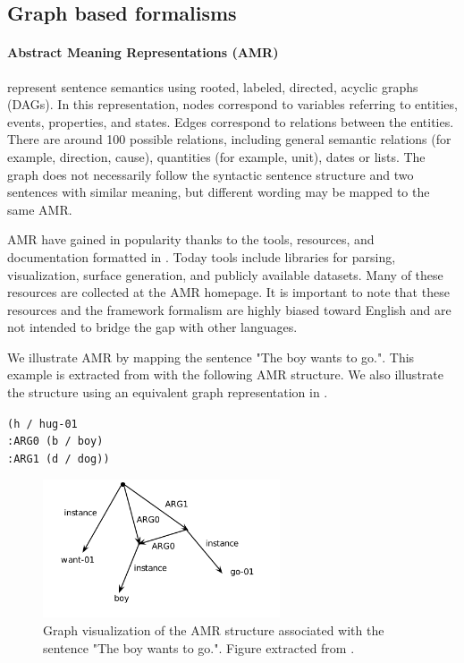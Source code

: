 \subsection{Graph based formalisms} 

\paragraph{Abstract Meaning Representations (AMR)} represent sentence semantics using rooted, labeled, directed, acyclic graphs (DAGs). In this representation, nodes correspond to variables referring to entities, events, properties, and states. Edges correspond to relations between the entities. There are around 100 possible relations, including general semantic relations (for example, direction, cause), quantities (for example, unit), dates or lists. The graph does not necessarily follow the syntactic sentence structure and two sentences with similar meaning, but different wording may be mapped to the same AMR. 

AMR have gained in popularity thanks to the tools, resources, and documentation formatted in \textcite{banarescu2013abstract}. Today tools include libraries for parsing, visualization, surface generation, and publicly available datasets. Many of these resources are collected at the AMR homepage. It is important to note that these resources and the framework formalism are highly biased toward English and are not intended to bridge the gap with other languages.

We illustrate AMR by mapping the sentence "The boy wants to go.". This example is extracted from \textcite{banarescu2013abstract} with the following AMR structure. We also illustrate the structure using an equivalent graph representation in .

\begin{center}
\texttt{(h\,/\,hug-01
    \\ \T :ARG0\,(b\,/\,boy)
    \\ \T :ARG1\,(d\,/\,dog))}    
\end{center}


\begin{figure}[!htb]
\begin{center}
\includegraphics[width=7cm]{images/amr-boy.png}
\end{center}
\caption{Graph visualization of the AMR structure associated with the sentence "The boy wants to go.". Figure extracted from \textcite{banarescu2013abstract}.}
\end{figure}

